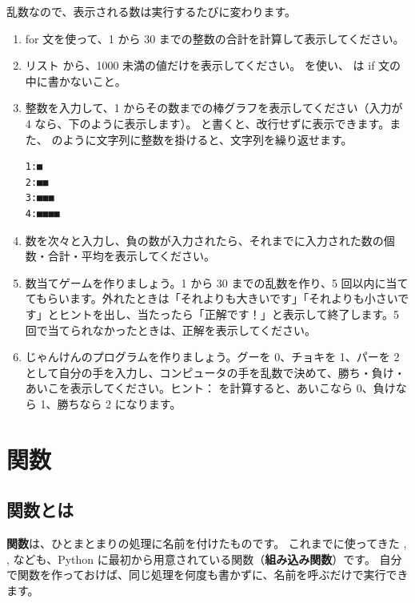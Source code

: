 
乱数なので、表示される数は実行するたびに変わります。

\begin{exercise}
\begin{enumerate}
  \item for 文を使って、1 から 30 までの整数の合計を計算して表示してください。
  \item リスト \cmd{[1, 62, 3, 6743, 51, 6783, 42, 4671, 5, 236]} から、1000 未満の値だけを表示してください。 を使い、 は if 文の中に書かないこと。
  \item 整数を入力して、1 からその数までの棒グラフを表示してください（入力が 4 なら、下のように表示します）。 と書くと、改行せずに表示できます。また、 のように文字列に整数を掛けると、文字列を繰り返せます。
\begin{verbatim}
1:■
2:■■
3:■■■
4:■■■■
\end{verbatim}
  \item 数を次々と入力し、負の数が入力されたら、それまでに入力された数の個数・合計・平均を表示してください。
  \item 数当てゲームを作りましょう。1 から 30 までの乱数を作り、5 回以内に当ててもらいます。外れたときは「それよりも大きいです」「それよりも小さいです」とヒントを出し、当たったら「正解です！」と表示して終了します。5 回で当てられなかったときは、正解を表示してください。
  \item じゃんけんのプログラムを作りましょう。グーを 0、チョキを 1、パーを 2 として自分の手を入力し、コンピュータの手を乱数で決めて、勝ち・負け・あいこを表示してください。ヒント： を計算すると、あいこなら 0、負けなら 1、勝ちなら 2 になります。
\end{enumerate}
\end{exercise}

\section{関数}
\label{sec:python-basics-function}

\subsection{関数とは}

\textbf{関数}は、ひとまとまりの処理に名前を付けたものです。
これまでに使ってきた , ,  なども、Python に最初から用意されている関数（\textbf{組み込み関数}）です。
自分で関数を作っておけば、同じ処理を何度も書かずに、名前を呼ぶだけで実行できます。

